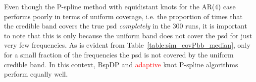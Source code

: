 \documentclass[twocolumn,final]{svjour3}
\begin{document}
Even though the P-spline method with equidistant knots for the AR(4) case performs poorly in terms of uniform coverage, i.e. the proportion of times that the credible band covers  the true psd {\em completely} in the 300 runs, it is important to note that this is only because the uniform band does not cover
the psd for  just very few frequencies. As is evident from 
  Table~\ref{table:sim_covPbb_median},  only for a small fraction of the frequencies the psd is not covered by the uniform credible band.  In this context, BspDP and \textcolor{red}{adaptive} knot P-spline algorithms perform equally well.  

\end{document}
